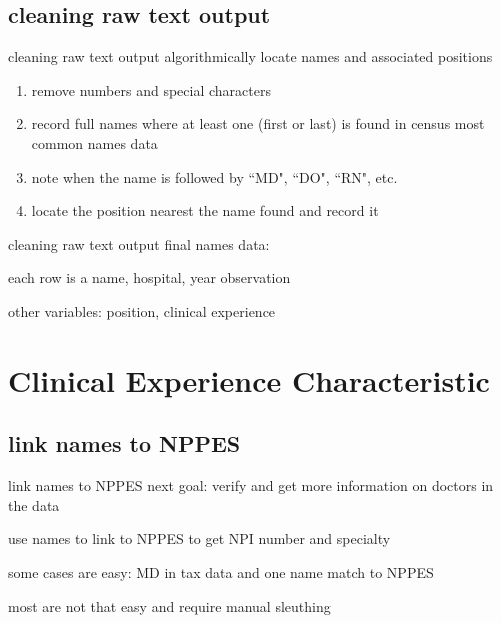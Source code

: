 \documentclass[notes,11pt, aspectratio=169]{beamer}
\newenvironment{wideitemize}{\itemize\addtolength{\itemsep}{10pt}}{\enditemize}
\begin{document}
\subsection{cleaning raw text output}

\begin{frame}{cleaning raw text output}
algorithmically locate names and associated positions

\vspace{4mm}

\begin{enumerate}
    \item remove numbers and special characters
    \item record full names where at least one (first or last) is found in census most common names data
    \item note when the name is followed by ``MD", ``DO", ``RN", etc. 
    \item locate the position nearest the name found and record it
\end{enumerate}
\end{frame}

\begin{frame}{cleaning raw text output}
    final names data:
    \vspace{4mm}
    \begin{wideitemize}
        \item each row is a name, hospital, year observation
        \item other variables: position, clinical experience
    \end{wideitemize}
\end{frame}



\section{Clinical Experience Characteristic}

\subsection{link names to NPPES}

\begin{frame}{link names to NPPES}
    next goal: verify and get more information on doctors in the data
    \vspace{4mm}
    \begin{wideitemize}
        \item use names to link to NPPES to get NPI number and specialty
        \item some cases are easy: MD in tax data and one name match to NPPES
        \item most are not that easy and require manual sleuthing
    \end{wideitemize}
\end{frame}
\end{document}
